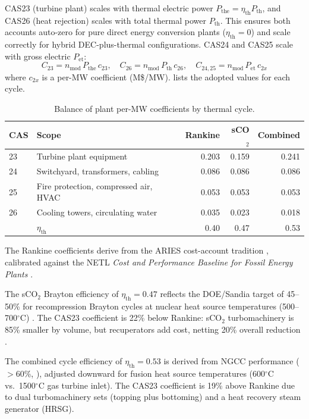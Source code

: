 \documentclass{article}
\begin{document}
CAS23 (turbine plant) scales with thermal electric power
$P_{\text{the}} = \eta_{\text{th}} P_{\text{th}}$, and CAS26 (heat
rejection) scales with total thermal power $P_{\text{th}}$. This ensures
both accounts auto-zero for pure direct energy conversion plants
($\eta_{\text{th}} = 0$) and scale correctly for hybrid DEC-plus-thermal
configurations. CAS24 and CAS25 scale with gross electric $P_{\text{et}}$:
\begin{equation}
\label{eq:bop}
C_{23} = n_{\text{mod}} \, P_{\text{the}} \, c_{23}, \quad
C_{26} = n_{\text{mod}} \, P_{\text{th}} \, c_{26}, \quad
C_{24,25} = n_{\text{mod}} \, P_{\text{et}} \, c_{2x}
\end{equation}
\noindent where $c_{2x}$ is a per-MW coefficient (M\$/MW).
 lists the adopted values for each cycle.

\begin{table}[htbp]
\caption{Balance of plant per-MW coefficients by thermal cycle.}
\label{tab:bop}
\centering
\begin{tabular}{llrrr}
\toprule
CAS & Scope & Rankine & sCO$_2$ & Combined \\
\midrule
23 & Turbine plant equipment & 0.203 & 0.159 & 0.241 \\
24 & Switchyard, transformers, cabling & 0.086 & 0.086 & 0.086 \\
25 & Fire protection, compressed air, HVAC & 0.053 & 0.053 & 0.053 \\
26 & Cooling towers, circulating water & 0.035 & 0.023 & 0.018 \\
\midrule
& $\eta_{\text{th}}$ & 0.40 & 0.47 & 0.53 \\
\bottomrule
\end{tabular}
\end{table}

The Rankine coefficients derive from the ARIES cost-account tradition
\citep{waganer2013}, calibrated against the NETL \textit{Cost and
Performance Baseline for Fossil Energy Plants} \citep{netl2022}.

The sCO$_2$ Brayton efficiency of $\eta_{\text{th}} = 0.47$ reflects the
DOE/Sandia target of 45--50\% for recompression Brayton cycles at nuclear
heat source temperatures (500--700$^\circ$C)
\citep{doe_qtr2015_sco2,sandia_aec}. The CAS23 coefficient is 22\% below
Rankine: sCO$_2$ turbomachinery is 85\% smaller by volume, but
recuperators add cost, netting 20\% overall reduction
\citep{ncepu_sco2_comparison}.

The combined cycle efficiency of $\eta_{\text{th}} = 0.53$ is derived from
NGCC performance ($>$60\%, \citealt{netl2022}), adjusted downward for fusion
heat source temperatures (600$^\circ$C vs.\ 1500$^\circ$C gas
turbine inlet). The CAS23 coefficient is 19\% above Rankine due to dual
turbomachinery sets (topping plus bottoming) and a heat recovery steam generator (HRSG).
\end{document}

